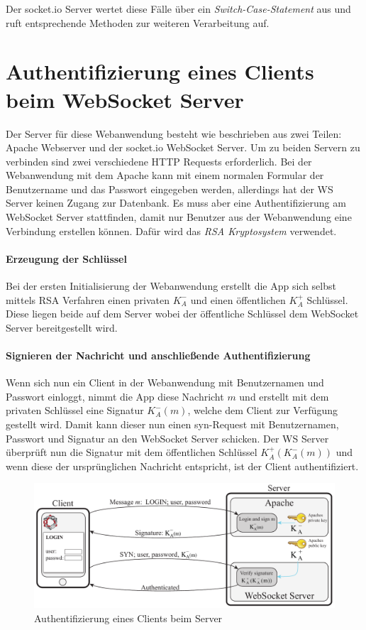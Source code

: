 Der socket.io Server wertet diese Fälle über ein \emph{Switch-Case-Statement} aus und ruft entsprechende Methoden zur weiteren Verarbeitung auf.

\section{Authentifizierung eines Clients beim WebSocket Server}
Der Server für diese Webanwendung besteht wie beschrieben aus zwei Teilen: Apache Webserver und der socket.io WebSocket Server. Um zu beiden Servern zu verbinden sind zwei verschiedene HTTP Requests erforderlich. Bei der Webanwendung mit dem Apache kann mit einem normalen Formular der Benutzername und das Passwort eingegeben werden, allerdings hat der WS Server keinen Zugang zur Datenbank. Es muss aber eine Authentifizierung am WebSocket Server stattfinden, damit nur Benutzer aus der Webanwendung eine Verbindung erstellen können. Dafür wird das \emph{RSA Kryptosystem} verwendet.

\paragraph{Erzeugung der Schlüssel}
Bei der ersten Initialisierung der Webanwendung erstellt die App sich selbst mittels RSA Verfahren einen privaten $K^-_A$ und einen öffentlichen $K^+_A$ Schlüssel. Diese liegen beide auf dem Server wobei der öffentliche Schlüssel dem WebSocket Server bereitgestellt wird.

\paragraph{Signieren der Nachricht und anschließende Authentifizierung}
Wenn sich nun ein Client in der Webanwendung mit Benutzernamen und Passwort einloggt, nimmt die App diese Nachricht $m$ und erstellt mit dem privaten Schlüssel eine Signatur $K^-_A(m)$, welche dem Client zur Verfügung gestellt wird. Damit kann dieser nun einen syn-Request mit Benutzernamen, Passwort und Signatur an den WebSocket Server schicken. Der WS Server überprüft nun die Signatur mit dem öffentlichen Schlüssel $K^+_A(K^-_A(m))$ und wenn diese der ursprünglichen Nachricht entspricht, ist der Client authentifiziert.

\begin{figure}[!ht]
	\centering
	\includegraphics[width=15cm]{fig/publicprivate}
	\caption{Authentifizierung eines Clients beim Server}
\end{figure}

